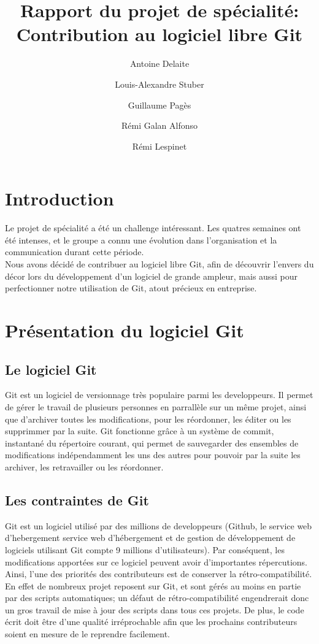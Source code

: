 \documentclass[a4paper, 12pt]{article}
\title{Rapport du projet de spécialité:\\ Contribution au logiciel libre Git}
\author{Antoine Delaite \and Louis-Alexandre Stuber \and Guillaume Pagès \and Rémi Galan Alfonso \and Rémi Lespinet}
\date{}
\begin{document}
\maketitle

\section{Introduction}

Le projet de spécialité a été un challenge intéressant. Les quatres semaines ont été intenses, et le groupe a connu une évolution dans l'organisation et la communication durant cette période.\\

Nous avons décidé de contribuer au logiciel libre Git, afin de découvrir l'envers du décor lors du développement d'un logiciel de grande ampleur, mais aussi pour perfectionner notre utilisation de Git, atout précieux en entreprise.

\section{Présentation du logiciel Git}

\subsection{Le logiciel Git}

Git est un logiciel de versionnage très populaire parmi les developpeurs.
Il permet de gérer le travail de plusieurs personnes en parrallèle sur un même projet, ainsi que d'archiver toutes les modifications, pour les réordonner, les éditer ou les supprimmer par la suite.
Git fonctionne grâce à un système de commit, instantané du répertoire courant, qui permet de sauvegarder des ensembles de modifications indépendamment les uns des autres pour pouvoir par la suite les archiver, les retravailler ou les réordonner.

\subsection{Les contraintes de Git}

Git est un logiciel utilisé par des millions de developpeurs (Github, le service web d'hebergement service web d'hébergement et de gestion de développement de logiciels utilisant Git compte 9 millions d'utilisateurs).
Par conséquent, les modifications apportées sur ce logiciel peuvent avoir d'importantes répercutions.
Ainsi, l'une des priorités des contributeurs est de conserver la rétro-compatibilité.
En effet de nombreux projet reposent sur Git, et sont gérés au moins en partie par des scripts automatiques; un défaut de rétro-compatibilité engendrerait donc un gros travail de mise à jour des scripts dans tous ces projets. 
De plus, le code écrit doit être d'une qualité irréprochable afin que les prochains contributeurs soient en mesure de le reprendre facilement.
\end{document}
